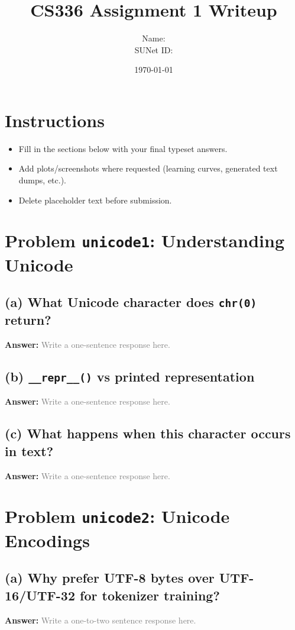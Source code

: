 \documentclass[11pt]{article}
\title{CS336 Assignment 1 Writeup}
\author{%
  Name: \underline{\hspace{2.5in}}\\
  SUNet ID: \underline{\hspace{2.2in}}
}
\date{\today}
\newcommand{\answer}{\textbf{Answer:} \vspace{1.5em}}
\newcommand{\placeholder}[1]{\textcolor{gray}{#1}}
\begin{document}
\maketitle

\section*{Instructions}
\begin{itemize}[leftmargin=1.5em]
  \item Fill in the sections below with your final typeset answers.
  \item Add plots/screenshots where requested (learning curves, generated text dumps, etc.).
  \item Delete placeholder text before submission.
\end{itemize}

\tableofcontents
\newpage

\section{Problem \texttt{unicode1}: Understanding Unicode}
\subsection*{(a) What Unicode character does \texttt{chr(0)} return?}
\answer
\placeholder{Write a one-sentence response here.}

\subsection*{(b) \texttt{\_\_repr\_\_()} vs printed representation}
\answer
\placeholder{Write a one-sentence response here.}

\subsection*{(c) What happens when this character occurs in text?}
\answer
\placeholder{Write a one-sentence response here.}

\section{Problem \texttt{unicode2}: Unicode Encodings}
\subsection*{(a) Why prefer UTF-8 bytes over UTF-16/UTF-32 for tokenizer training?}
\answer
\placeholder{Write a one-to-two sentence response here.}
\end{document}
